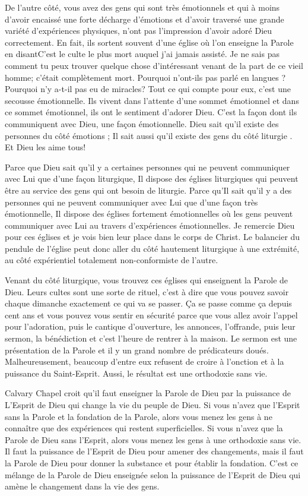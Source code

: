 De l’autre côté, vous avez des gens qui sont très émotionnels et qui à moins d’avoir encaissé une forte décharge
d'émotions et d'avoir traversé une grande variété d'expériences physiques, n’ont pas l’impression d’avoir adoré Dieu
correctement. En fait, ils sortent souvent d’une église où l’on enseigne la Parole en disant\frcolon\og C’est le culte le plus mort
auquel j’ai jamais assisté. Je ne sais pas comment tu peux trouver quelque chose d’intéressant venant de la part de
ce vieil homme; c’était complètement mort. Pourquoi n’ont-ils pas parlé en langues ? Pourquoi n'y a-t-il pas eu de
miracles?\fg{} Tout ce qui compte pour eux, c'est une secousse émotionnelle. Ils vivent dans l’attente d’une sommet
émotionnel et dans ce sommet émotionnel, ils ont le sentiment d’adorer Dieu. C’est la façon dont ils communiquent
avec Dieu, une façon émotionnelle. Dieu sait qu’il existe des personnes du côté \og émotions \fg{}; Il sait aussi qu’il existe
des gens du côté \og liturgie \fg{}. Et Dieu les aime tous!

Parce que Dieu sait qu’il y a certaines personnes qui ne peuvent communiquer avec Lui que d’une façon liturgique, Il
dispose des églises liturgiques qui peuvent être au service des gens qui ont besoin de liturgie. Parce qu'Il sait qu’il y a
des personnes qui ne peuvent communiquer avec Lui que d’une façon très émotionnelle, Il dispose des églises
fortement émotionnelles où les gens peuvent communiquer avec Lui au travers d’expériences émotionnelles. Je
remercie Dieu pour ces églises et je vois bien leur place dans le corps de Christ. Le balancier du pendule de l’église
peut donc aller du côté hautement liturgique à une extrémité, au côté \og expérientiel \fg{} totalement non-conformiste de
l’autre.

Venant du côté liturgique, vous trouvez ces églises qui enseignent la Parole de Dieu. Leurs cultes sont une sorte de
rituel, c’est à dire que vous pouvez savoir chaque dimanche exactement ce qui va se passer. Ça se passe comme ça
depuis cent ans et vous pouvez vous sentir en sécurité parce que vous allez avoir l’appel pour l’adoration, puis le
cantique d’ouverture, les annonces, l’offrande, puis leur sermon, la bénédiction et c’est l’heure de rentrer à la maison.
Le sermon est une présentation de la Parole et il y un grand nombre de prédicateurs doués. Malheureusement,
beaucoup d’entre eux refusent de croire à l’onction et à la puissance du Saint-Esprit. Aussi, le résultat est une
orthodoxie sans vie.

Calvary Chapel croit qu'il faut enseigner la Parole de Dieu par la puissance de L’Esprit de Dieu qui change la vie du
peuple de Dieu. Si vous n’avez que l’Esprit sans la Parole et la fondation de la Parole, alors vous menez les gens à ne
connaître que des expériences qui restent superficielles. Si vous n’avez que la Parole de Dieu sans l’Esprit, alors vous
menez les gens à une orthodoxie sans vie. Il faut la puissance de l’Esprit de Dieu pour amener des changements,
mais il faut la Parole de Dieu pour donner la substance et pour établir la fondation. C’est ce mélange de la Parole de
Dieu enseignée selon la puissance de l’Esprit de Dieu qui amène le changement dans la vie des gens.

